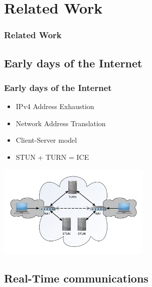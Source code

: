 \documentclass[compress]{beamer}
\begin{document}
\section{Related Work}\label{related}

\begin{frame}[t,shrink]
\frametitle{Related Work} 

\end{frame}

	\subsection{Early days of the Internet}\label{early}


  		\begin{frame}[c]
		\frametitle{Early days of the Internet}
		\begin{itemize}
		\item IPv4 Address Exhaustion
		\vfill
		\item Network Address Translation	
		\vfill
		\item Client-Server model
		\vfill
		\item STUN + TURN = ICE
		\end{itemize}
		\begin{flushright}

			\vspace*{-8\baselineskip}
			\includegraphics[width=0.55\textwidth]{figures/ice.pdf}
		\end{flushright}
		
		\end{frame}




	\subsection{Real-Time communications}\label{rtc}
\end{document}
